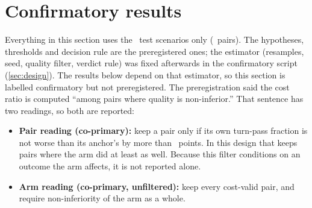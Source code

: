 \section{Confirmatory results}\label{sec:confirm}

Everything in this section uses the \NTest\ test scenarios only (\NTestPairs\ pairs). The hypotheses,
thresholds and decision rule are the preregistered ones; the estimator (resamples, seed, quality filter,
verdict rule) was fixed afterwards in the confirmatory script (\cref{sec:design}). The results below depend on
that estimator, so this section is labelled confirmatory but not preregistered. The preregistration said the cost ratio is computed ``among pairs where quality is
non-inferior.'' That sentence has two readings, so both are reported:
\begin{itemize}
  \item \textbf{Pair reading (co-primary):} keep a pair only if its own turn-pass fraction is not worse than
    its anchor's by more than \NIMarginPts\ points. In this design that keeps pairs where the arm did at
    least as well. Because this filter conditions on an outcome the arm affects, it is not reported alone.
  \item \textbf{Arm reading (co-primary, unfiltered):} keep every cost-valid pair, and require non-inferiority of
    the arm as a whole.
\end{itemize}

\begin{table}[htbp]
\centering\small
\caption{Primary endpoint: geometric-mean cost ratio, arm over plain host, test split, with 95\,\%
scenario-cluster bootstrap intervals. ``Pairs kept'' counts pairs that pass the pair-level quality filter
out of all cost-valid test pairs.}
\label{tab:primary}

\end{table}

